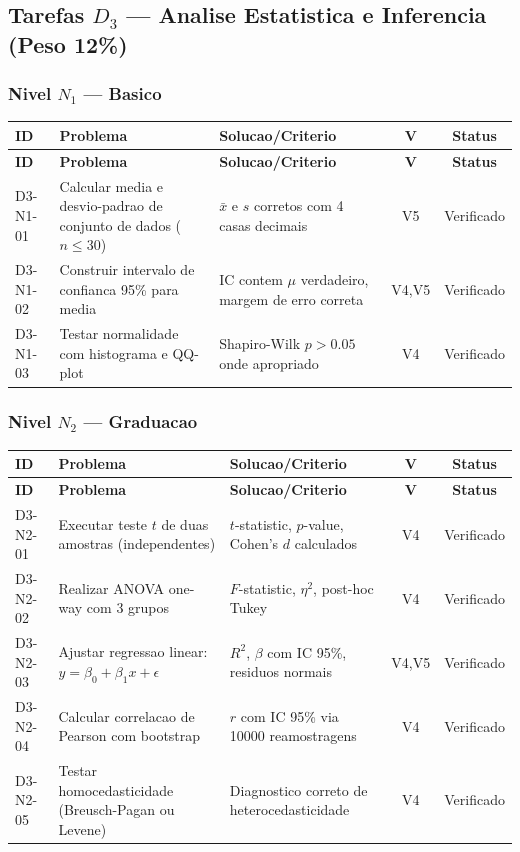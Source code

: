 \subsection{Tarefas $D_3$ --- Analise Estatistica e Inferencia (Peso 12\%)}

\subsubsection{Nivel $N_1$ --- Basico}

\begin{longtable}{|p{2.0cm}|p{4.2cm}|p{4.2cm}|c|c|}
\hline
\textbf{ID} & \textbf{Problema} & \textbf{Solucao/Criterio} & \textbf{V} & \textbf{Status} \\
\hline
\endfirsthead
\hline
\textbf{ID} & \textbf{Problema} & \textbf{Solucao/Criterio} & \textbf{V} & \textbf{Status} \\
\hline
\endhead
\hline
\endfoot
D3-N1-01 & Calcular media e desvio-padrao de conjunto de dados ($n\leq 30$) & $\bar{x}$ e $s$ corretos com 4 casas decimais & V5 & Verificado \\
\hline
D3-N1-02 & Construir intervalo de confianca 95\% para media & IC contem $\mu$ verdadeiro, margem de erro correta & V4,V5 & Verificado \\
\hline
D3-N1-03 & Testar normalidade com histograma e QQ-plot & Shapiro-Wilk $p>0.05$ onde apropriado & V4 & Verificado \\
\hline
\end{longtable}

\subsubsection{Nivel $N_2$ --- Graduacao}

\begin{longtable}{|p{2.0cm}|p{4.2cm}|p{4.2cm}|c|c|}
\hline
\textbf{ID} & \textbf{Problema} & \textbf{Solucao/Criterio} & \textbf{V} & \textbf{Status} \\
\hline
\endfirsthead
\hline
\textbf{ID} & \textbf{Problema} & \textbf{Solucao/Criterio} & \textbf{V} & \textbf{Status} \\
\hline
\endhead
\hline
\endfoot
D3-N2-01 & Executar teste $t$ de duas amostras (independentes) & $t$-statistic, $p$-value, Cohen's $d$ calculados & V4 & Verificado \\
\hline
D3-N2-02 & Realizar ANOVA one-way com 3 grupos & $F$-statistic, $\eta^{2}$, post-hoc Tukey & V4 & Verificado \\
\hline
D3-N2-03 & Ajustar regressao linear: $y=\beta_{0}+\beta_{1}x+\epsilon$ & $R^{2}$, $\beta$ com IC 95\%, residuos normais & V4,V5 & Verificado \\
\hline
D3-N2-04 & Calcular correlacao de Pearson com bootstrap & $r$ com IC 95\% via 10000 reamostragens & V4 & Verificado \\
\hline
D3-N2-05 & Testar homocedasticidade (Breusch-Pagan ou Levene) & Diagnostico correto de heterocedasticidade & V4 & Verificado \\
\hline
\end{longtable}

